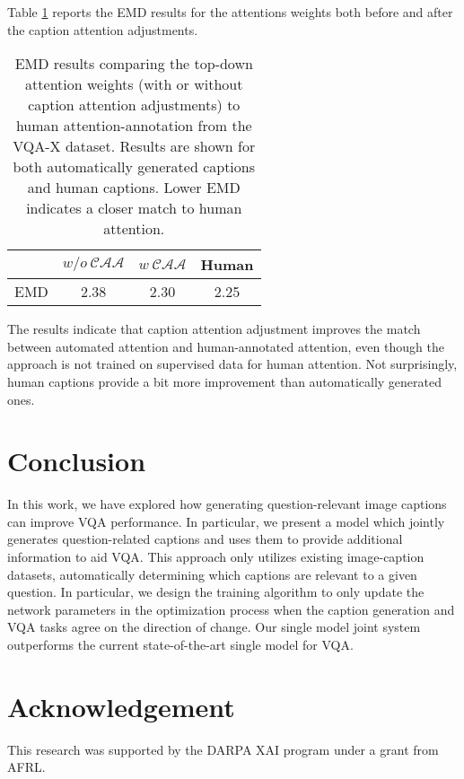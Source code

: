 \documentclass[11pt,a4paper]{article}
\begin{document}
Table \ref{tab:emd} reports the EMD results for the attentions weights both before and after the caption attention adjustments. 
\begin{table}[!h]
\centering
\begin{tabular}{l|c|c|c}
\hline \toprule
     &  $w/o~\mathcal{CAA}$  & $w~\mathcal{CAA}$ & Human  \\\hline
EMD  & 2.38  & 2.30    & 2.25    \\\bottomrule
\end{tabular}
\caption{EMD results comparing the top-down attention weights (with or without caption attention adjustments) to human attention-annotation from the VQA-X dataset. Results are shown for both automatically generated captions and human captions. Lower EMD indicates a closer match to human attention.}
\label{tab:emd}
\end{table}

The results indicate that caption attention adjustment improves the match between automated attention and human-annotated attention, even though the approach is not trained on supervised data for human attention. Not surprisingly, human captions provide a bit more improvement than automatically generated ones.

\section{Conclusion}
In this work, we have explored how generating question-relevant image captions can improve VQA performance.  In particular, we present a model which jointly generates question-related captions  and uses them to provide additional information to aid VQA. This approach only utilizes existing image-caption datasets, automatically determining which captions are relevant to a given question. In particular, we design the training algorithm to only update the network parameters in the optimization process when the  caption generation and VQA tasks agree on the direction of change. Our single model joint system outperforms the current state-of-the-art single model for VQA. 
\section*{Acknowledgement}
This research was supported by the DARPA XAI program under a grant from AFRL. 


\end{document}
